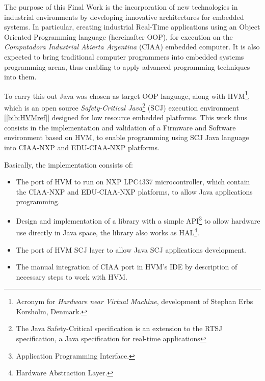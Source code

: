 \newpage
{}\linebreak \linebreak \linebreak \linebreak \linebreak
{} \linebreak \linebreak \linebreak 

The purpose of this Final Work is the incorporation of new technologies in industrial environments by developing innovative architectures for embedded systems. In particular, creating industrial Real-Time applications using an Object Oriented Programming language (hereinafter OOP), for execution on the \textit{Computadora Industrial Abierta Argentina} (CIAA) embedded computer. It is also expected to bring traditional computer programmers into embedded systems programming arena, thus enabling to apply advanced programming techniques into them.

\medskip

To carry this out Java was chosen as target OOP language, along with HVM\footnote{Acronym for \textit{Hardware near Virtual Machine}, development of Stephan Erbs Korsholm, Denmark.}, which is an open source \textit{Safety-Critical Java}\footnote{The Java Safety-Critical specification is an extension to the RTSJ specification, a Java specification for real-time applications} (SCJ) execution environment  [\ref{bib:HVMref}] designed for low resource embedded platforms. This work thus consists in the implementation and validation of a Firmware and Software environment based on HVM, to enable programming using SCJ Java language into CIAA-NXP and EDU-CIAA-NXP platforms.

\medskip
\noindent Basically, the implementation consists of:

\begin{itemize}
\item 
The port of HVM to run on NXP LPC4337 microcontroller, which contain the CIAA-NXP and EDU-CIAA-NXP platforms, to allow Java applications programming.
\item 
Design and implementation of a library with a simple API\footnote{Application Programming Interface.} to allow hardware use directly in Java space, the library also works as HAL\footnote{Hardware Abstraction Layer.}.
\item 
The port of HVM SCJ layer to allow Java SCJ applications development.
\item 
The manual integration of CIAA port in HVM's IDE by description of necessary steps to work with HVM.
\end{itemize}

